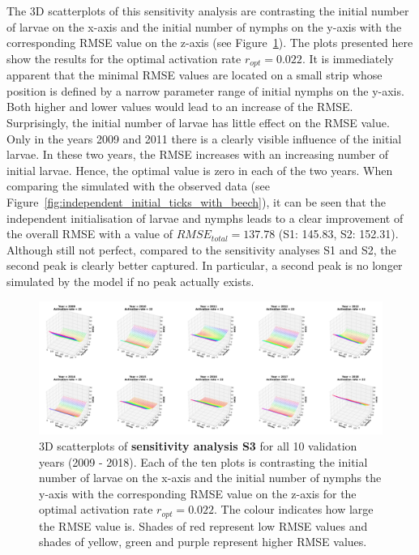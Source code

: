\documentclass[a4paper, 11pt]{scrartcl}
\begin{document}
The 3D scatterplots of this sensitivity analysis are contrasting the initial number of larvae on the x-axis and the initial number of nymphs on the y-axis with the corresponding RMSE value on the z-axis (see Figure~\ref{fig:S3_2009_2018_rmse}). The plots presented here show the results for the optimal activation rate $r_{opt}= 0.022$. It is immediately apparent that the minimal RMSE values are located on a small strip whose position is defined by a narrow parameter range of initial nymphs on the y-axis. Both higher and lower values would lead to an increase of the RMSE. Surprisingly, the initial number of larvae has little effect on the RMSE value. Only in the years 2009 and 2011 there is a clearly visible influence of the initial larvae. In these two years, the RMSE increases with an increasing number of initial larvae. Hence, the optimal value is zero in each of the two years. When comparing the simulated with the observed data (see Figure~\ref{fig:independent_initial_ticks_with_beech}), it can be seen that the independent initialisation of larvae and nymphs leads to a clear improvement of the overall RMSE with a value of $RMSE_{total} = 137.78$ (S1: 145.83, S2: 152.31). Although still not perfect, compared to the sensitivity analyses S1 and S2, the second peak is clearly better captured. In particular, a second peak is no longer simulated by the model if no peak actually exists.

\begin{figure}[h!]
\centering
\includegraphics[width=\linewidth]{figures/S3_2009_2018_rmse}
\caption{3D scatterplots of \textbf{sensitivity analysis S3} for all 10 validation years (2009 - 2018). Each of the ten plots is contrasting the initial number of larvae on the x-axis and the initial number of nymphs the y-axis with the corresponding RMSE value on the z-axis for the optimal activation rate $r_{opt} = 0.022$. The colour indicates how large the RMSE value is. Shades of red represent low RMSE values and shades of yellow, green and purple represent higher RMSE values.}
\label{fig:S3_2009_2018_rmse}
\end{figure}
\end{document}
